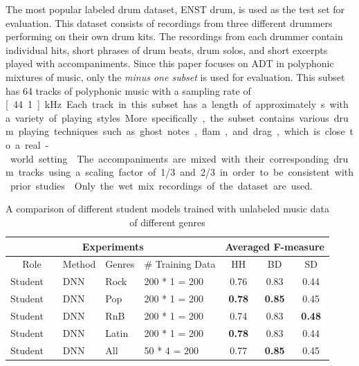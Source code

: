 \documentclass{article}
\begin{document}
The most popular labeled drum dataset, ENST drum\cite{Gillet2006}, is used as the test set for evaluation. This dataset consists of recordings from three different drummers performing on their own drum kits. The recordings from each drummer contain individual hits, short phrases of drum beats, drum solos, and short excerpts played with accompaniments. Since this paper focuses on ADT in polyphonic mixtures of music, only the \textit{minus one subset} is used for evaluation. This subset has 64 tracks of polyphonic music with a sampling rate of \unit[44.1]{kHz}. Each track in this subset has a length of approximately \unit[50--70]{s} with a variety of playing styles. More specifically, the subset contains various drum playing techniques such as ghost notes, flam, and drag, which is close to a real-world setting \cite{Wu2016}. The accompaniments are mixed with their corresponding drum tracks using a scaling factor of 1/3 and 2/3 in order to be consistent with prior studies \cite{Paulus2009a, Wu2015a, Southall2016}. Only the wet mix recordings of the dataset are used. 


\begin{table}
\centering
\begin{tabular*}{\textwidth}{l@{\extracolsep{\fill}}llllccc}
\hline
\multicolumn{5}{c}{Experiments}                               & \multicolumn{3}{c}{Averaged F-measure}           \\ \hline
\multicolumn{2}{c}{Role} & Method & Genres & \# Training Data & HH             & BD             & SD             \\ \hline
Student    &             & DNN    & Rock   & 200 * 1 = 200    & 0.76          & 0.83          & 0.44          \\
Student    &             & DNN    & Pop    & 200 * 1 = 200    & \textbf{0.78} & \textbf{0.85} & 0.45          \\
Student    &             & DNN    & RnB    & 200 * 1 = 200    & 0.74          & 0.83          & \textbf{0.48} \\
Student    &             & DNN    & Latin  & 200 * 1 = 200    & \textbf{0.78} & 0.83          & 0.44          \\
Student    &             & DNN    & All     & 50   * 4 = 200     & 0.77          & \textbf{0.85}          & 0.45          \\ \hline
\end{tabular*}
\caption{A comparison of different student models trained with unlabeled music data of different genres}%
\label{tab:genre_results}
\end{table}
\end{document}
